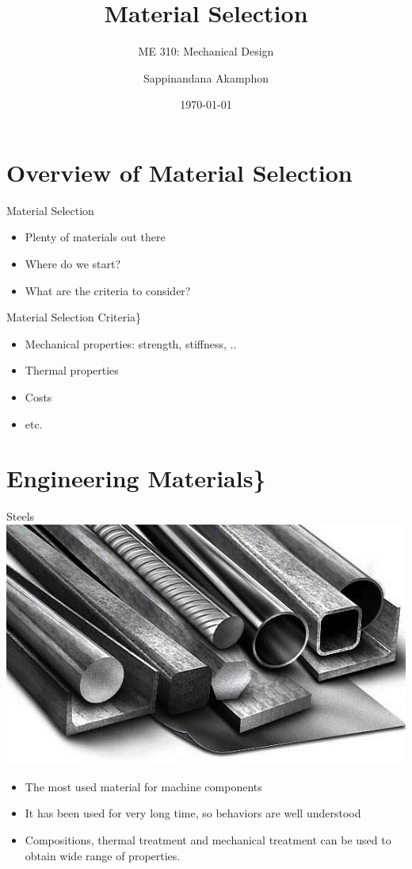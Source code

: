 \documentclass[10pt, svgnames]{beamer}
\author{Sappinandana Akamphon}
\date{\today}
\title{Material Selection}
\subtitle{ME 310: Mechanical Design}
\institute{Department of Mechanical Engineering, TSE}
\date{}
\begin{document}
\frame{\titlepage}

\section{Overview of Material Selection}
\label{sec:orgc3ef6e3}

\begin{frame}[label={sec:org7ee4ae1}]{Material Selection}
\begin{itemize}
\item Plenty of materials out there
\item Where do we start?
\item What are the criteria to consider?
\end{itemize}
\end{frame}

\begin{frame}[label={sec:orgd8c1652}]{Material Selection Criteria\}}
\begin{itemize}
\item Mechanical properties: strength, stiffness, ..
\item Thermal properties
\item Costs
\item etc.
\end{itemize}
\end{frame}

\section{Engineering Materials\}}
\label{sec:org5ba890d}

\begin{frame}[label={sec:org5663273}]{Steels}
\centering
\includegraphics[height=0.4\textwidth]{pictures/steels}

\begin{itemize}
\item The most used material for machine components
\item It has been used for very long time, so behaviors are well understood
\item Compositions, thermal treatment and mechanical treatment can be used to obtain wide range of properties.
\end{itemize}
\end{frame}
\end{document}
